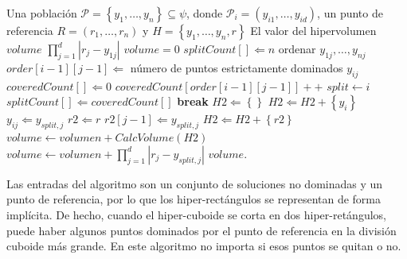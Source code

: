  \begin{algorithm}
  \begin{algorithmic}[1]
	\REQUIRE Una poblaci\'on $\mathcal{P}=\left\{y_1,\ldots,y_n\right\} \subseteq \psi$, donde $\mathcal{P}_i = \left(y_{i 1},\ldots,y_{i d}\right) $, 
	un punto de referencia $R=\left(r_1,\ldots,r_n\right)$ y $H =\left\{y_1,\ldots,y_n, r\right\}$
	\ENSURE El valor del hipervolumen $volume$
		\RETURN $\prod^{d}_{j=1}\left|r_j - y_ {1 j}\right|$
	\ENDIF
	\STATE $volume = 0$
	\STATE $splitCount\left[\right]\Leftarrow n$
		\STATE ordenar $y_{1j},\ldots,y_{nj}$
			\STATE $order\left[i-1\right]\left[j-1\right]\Leftarrow$ n\'umero de puntos 
			estrictamente dominados $y_{ij}$ 
		\ENDFOR
	\ENDFOR
			\STATE $coveredCount\left[\right]\Leftarrow 0$
				\STATE $coveredCount\left[order\left[i-1\right]\left[j-1\right]\right]++$			
			\ENDFOR
					\STATE $split \leftarrow i$
					\STATE $splitCount\left[\right]\Leftarrow coveredCount\left[\right]$
					\STATE \textbf{break}					
				\ENDIF				
			\ENDFOR
	\ENDFOR
			\STATE $H2\Leftarrow\left\{\right\}$
					\STATE $H2\Leftarrow H2+\left\{y_i\right\}$
					\STATE $y_{ij} \Leftarrow y_{split,j}$
				\ENDIF				
			\ENDFOR
			\STATE $r2\Leftarrow r$
			\STATE $r2\left[j-1\right]\Leftarrow  y_{split,j}$
			\STATE $H2\Leftarrow H2 + \left\{r2\right\}$
			\STATE $volume \leftarrow volumen + CalcVolume\left(H2\right)$
		\ENDIF
	\ENDFOR
	\STATE $volume \leftarrow volumen + \prod^{d}_{j=1}\left|r_j - y_ {split,j}\right|$
	\RETURN $volume$.
\end{algorithmic}
\caption{$CalcVolume\left(H\right)$}
\label{alg:hv}
\end{algorithm}

  Las entradas del algoritmo son un conjunto de soluciones no dominadas y un punto de referencia, por lo que los 
  hiper-rect\'angulos se representan de forma impl\'icita. De hecho, cuando el hiper-cuboide se corta en dos  
  hiper-ret\'angulos, puede haber algunos puntos dominados por el punto de referencia en la divisi\'on cuboide m\'as 
  grande. En este algoritmo no importa si esos puntos se quitan o no. 
 
